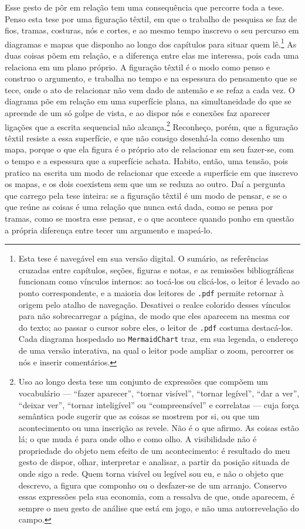 Esse gesto de pôr em relação tem uma consequência que percorre toda a tese. Penso esta tese por uma figuração têxtil, em que o trabalho de pesquisa se faz de fios, tramas, costuras, nós e cortes, e ao mesmo tempo inscrevo o seu percurso em diagramas e mapas que disponho ao longo dos capítulos para situar quem lê.\footnote{Esta tese é navegável em sua versão digital. O sumário, as referências cruzadas entre capítulos, seções, figuras e notas, e as remissões bibliográficas funcionam como vínculos internos: ao tocá-los ou clicá-los, o leitor é levado ao ponto correspondente, e a maioria dos leitores de \texttt{.pdf} permite retornar à origem pelo atalho de navegação. Desativei o realce colorido desses vínculos para não sobrecarregar a página, de modo que eles aparecem na mesma cor do texto; ao passar o cursor sobre eles, o leitor de \texttt{.pdf} costuma destacá-los. Cada diagrama hospedado no \texttt{MermaidChart} traz, em sua legenda, o endereço de uma versão interativa, na qual o leitor pode ampliar o zoom, percorrer os nós e inserir comentários.} As duas coisas põem em relação, e a diferença entre elas me interessa, pois cada uma relaciona em um plano próprio. A figuração têxtil é o modo como penso e construo o argumento, e trabalha no tempo e na espessura do pensamento que se tece, onde o ato de relacionar não vem dado de antemão e se refaz a cada vez. O diagrama põe em relação em uma superfície plana, na simultaneidade do que se apreende de um só golpe de vista, e ao dispor nós e conexões faz aparecer ligações que a escrita sequencial não alcança.\footnote{Uso ao longo desta tese um conjunto de expressões que compõem um vocabulário --- \enquote{fazer aparecer}, \enquote{tornar visível}, \enquote{tornar legível}, \enquote{dar a ver}, \enquote{deixar ver}, \enquote{tornar inteligível} ou \enquote{compreensível} e correlatas --- cuja força semântica pode sugerir que as coisas se mostrem por si, ou que um acontecimento ou uma inscrição as revele. Não é o que afirmo. As coisas estão lá; o que muda é para onde olho e como olho. A visibilidade não é propriedade do objeto nem efeito de um acontecimento: é resultado do meu gesto de dispor, olhar, interpretar e analisar, a partir da posição situada de onde sigo a rede. Quem torna visível ou legível sou eu, e não o objeto que descrevo, a figura que componho ou o desfazer-se de um arranjo. Conservo essas expressões pela sua economia, com a ressalva de que, onde aparecem, é sempre o meu gesto de análise que está em jogo, e não uma autorrevelação do campo.} Reconheço, porém, que a figuração têxtil resiste a essa superfície, e que não consigo desenhá-la como desenho um mapa, porque o que ela figura é o próprio ato de relacionar em seu fazer-se, com o tempo e a espessura que a superfície achata. Habito, então, uma tensão, pois pratico na escrita um modo de relacionar que excede a superfície em que inscrevo os mapas, e os dois coexistem sem que um se reduza ao outro. Daí a pergunta que carrego pela tese inteira: se a figuração têxtil é um modo de pensar, e se o que reúne as coisas é uma relação que nunca está dada, como se pensa por tramas, como se mostra esse pensar, e o que acontece quando ponho em questão a própria diferença entre tecer um argumento e mapeá-lo.

